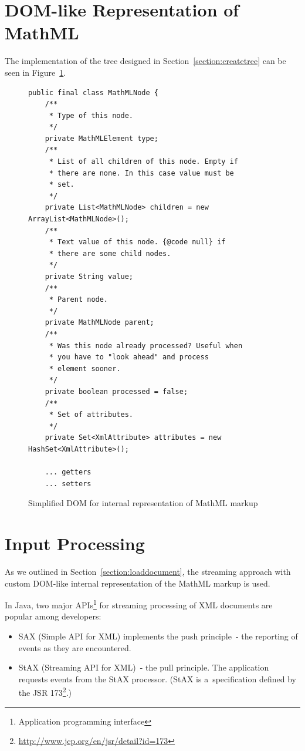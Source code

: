 \documentclass[11pt,oneside,final]{fithesis2}
\def\s#1{#1\index{#1}}
\begin{document}
\section{DOM-like Representation of MathML}
The implementation of the tree designed in Section~\ref{section:createtree} can be seen in Figure~\ref{fig:customdom}.

\begin{figure}[!ht]
\begin{lstlisting}
public final class MathMLNode {
    /**
     * Type of this node.
     */
    private MathMLElement type;
    /**
     * List of all children of this node. Empty if 
     * there are none. In this case value must be 
     * set.
     */
    private List<MathMLNode> children = new ArrayList<MathMLNode>();
    /**
     * Text value of this node. {@code null} if 
     * there are some child nodes.
     */
    private String value;
    /**
     * Parent node.
     */
    private MathMLNode parent;
    /**
     * Was this node already processed? Useful when 
     * you have to "look ahead" and process
     * element sooner.
     */
    private boolean processed = false;
    /**
     * Set of attributes.
     */
    private Set<XmlAttribute> attributes = new HashSet<XmlAttribute>();
    
    ... getters
    ... setters
\end{lstlisting}
\caption{Simplified DOM for internal representation of MathML markup}
\label{fig:customdom}
\end{figure}

\section{Input Processing}
As we outlined in Section~\ref{section:loaddocument}, the streaming approach with custom DOM-like internal representation of the MathML markup is used. 

In Java, two major APIs\footnote{Application programming interface} for streaming processing of XML documents are popular among developers:
\begin{itemize}
\item \s{SAX} (Simple API for XML) implements the push principle~- the reporting of events as they are encountered.
\item \s{StAX} (Streaming API for XML)~- the pull principle. The application requests events from the StAX processor. (StAX is a~specification defined by the JSR 173\footnote{\url{http://www.jcp.org/en/jsr/detail?id=173}}.)
\end{itemize}
\end{document}
